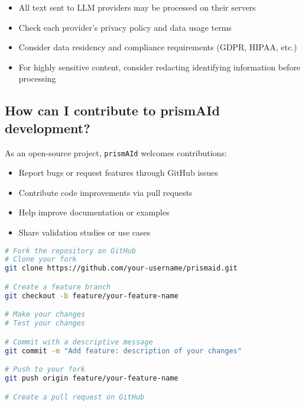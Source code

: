 \begin{itemize}
    \item All text sent to LLM providers may be processed on their servers
    \item Check each provider's privacy policy and data usage terms
    \item Consider data residency and compliance requirements (GDPR, HIPAA, etc.)
    \item For highly sensitive content, consider redacting identifying information before processing
\end{itemize}


\subsection{How can I contribute to prismAId development?}

As an open-source project, \texttt{prismAId} welcomes contributions:

\begin{itemize}
    \item Report bugs or request features through GitHub issues
    \item Contribute code improvements via pull requests
    \item Help improve documentation or examples
    \item Share validation studies or use cases
\end{itemize}

\begin{commandbox}
\begin{lstlisting}[language=Bash]
# Fork the repository on GitHub
# Clone your fork
git clone https://github.com/your-username/prismaid.git

# Create a feature branch
git checkout -b feature/your-feature-name

# Make your changes
# Test your changes

# Commit with a descriptive message
git commit -m "Add feature: description of your changes"

# Push to your fork
git push origin feature/your-feature-name

# Create a pull request on GitHub
\end{lstlisting}
\end{commandbox}

